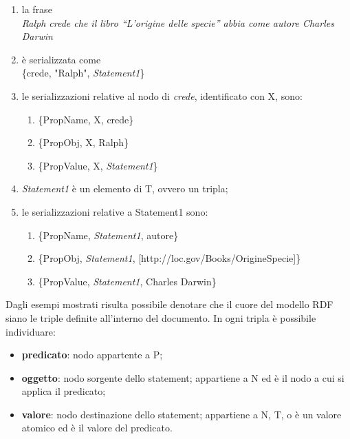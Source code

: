 \documentclass[12pt,a4paper,twoside]{book}
\begin{document}
\begin{enumerate}
\item la frase \\\textit{Ralph crede che il libro ``L'origine delle specie'' abbia come autore Charles Darwin}
\item è serializzata come \\ \{crede, "Ralph", \textit{Statement1}\}\newpage
\item le serializzazioni relative al nodo di \textit{crede}, identificato con X, sono:
\begin{enumerate}
\item \{PropName,  X, crede\}
\item \{PropObj,   X, Ralph\}
\item \{PropValue, X, \textit{Statement1}\}
\end{enumerate}
\item \textit{Statement1} è un elemento di T, ovvero un tripla;
\item le serializzazioni relative a Statement1 sono:
\begin{enumerate}
\item \{PropName, \textit{Statement1}, autore\}
\item \{PropObj, \textit{Statement1}, [http://loc.gov/Books/OrigineSpecie]\}
\item \{PropValue, \textit{Statement1}, Charles Darwin\}
\end{enumerate}
\end{enumerate}
Dagli esempi mostrati risulta possibile denotare che il cuore del modello RDF siano le triple definite all'interno del documento. In ogni tripla è possibile individuare:
\begin{itemize}
\item \textbf{predicato}: nodo appartente a P;
\item \textbf{oggetto}: nodo sorgente dello statement; appartiene a N ed è il nodo a cui si applica il predicato;
\item \textbf{valore}: nodo destinazione dello statement; appartiene a N, T, o è un valore atomico ed è il valore del predicato.
\end{itemize}
\newpage
\end{document}
